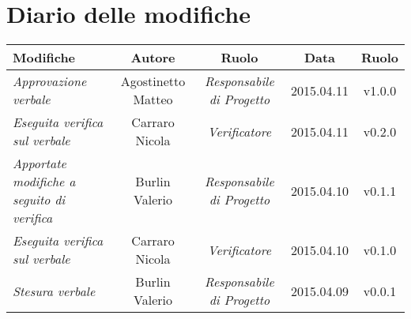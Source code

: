 \newpage
\section*{Diario delle modifiche}

\begin{table}[h]
\centering
\begin{tabular}{|p{}|c|c|c|c|}
	\toprule
		\textbf{Modifiche} & \textbf{Autore} & \textbf{Ruolo} & \textbf{Data} & \textbf{Ruolo} \\
	\midrule
	\midrule
		\textit{Approvazione verbale} & Agostinetto Matteo & \textit{Responsabile di Progetto} & 2015.04.11 & v1.0.0 \\									
	\midrule
		\textit{Eseguita verifica sul verbale} & Carraro Nicola & \textit{Verificatore} & 2015.04.11 & v0.2.0 \\
	\midrule
		\textit{Apportate modifiche a seguito di verifica} & Burlin Valerio & \textit{Responsabile di Progetto} & 2015.04.10 & v0.1.1 \\
	\midrule
		\textit{Eseguita verifica sul verbale} & Carraro Nicola & \textit{Verificatore} & 2015.04.10 & v0.1.0 \\		                               
	\midrule
		\textit{Stesura verbale} & Burlin Valerio & \textit{Responsabile di Progetto} & 2015.04.09 & v0.0.1 \\                         
	\bottomrule
\end{tabular}	
\end{table}

\newpage